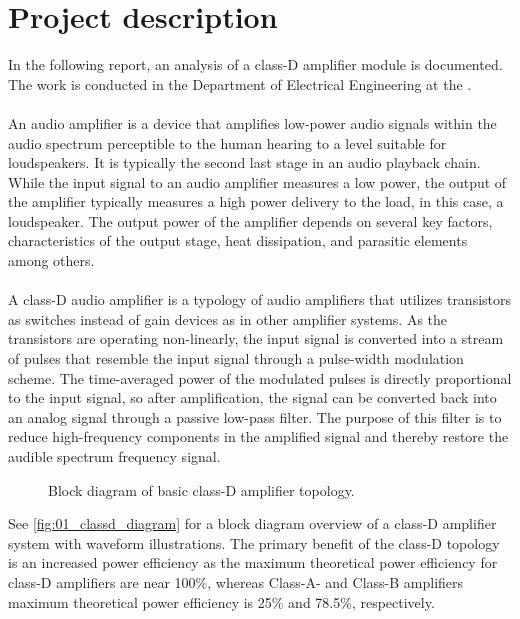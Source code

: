 \section{Project description} \label{sec:1.2_project_description}
In the following report, an analysis of a class-D amplifier module is documented. The work is conducted in the Department of Electrical Engineering at the \organisation. \\\\
An audio amplifier is a device that amplifies low-power audio signals within the audio spectrum perceptible to the human hearing to a level suitable for loudspeakers. It is typically the second last stage in an audio playback chain. While the input signal to an audio amplifier measures a low power, the output of the amplifier typically measures a high power delivery to the load, in this case, a loudspeaker. The output power of the amplifier depends on several key factors, characteristics of the output stage, heat dissipation, and parasitic elements among others. \\\\
A class-D audio amplifier is a typology of audio amplifiers that utilizes transistors as switches instead of gain devices as in other amplifier systems. As the transistors are operating non-linearly, the input signal is converted into a stream of pulses that resemble the input signal through a pulse-width modulation scheme. The time-averaged power of the modulated pulses is directly proportional to the input signal, so after amplification, the signal can be converted back into an analog signal through a passive low-pass filter. The purpose of this filter is to reduce high-frequency components in the amplified signal and thereby restore the audible spectrum frequency signal. \\

\begin{figure}[htbp]
    \centering
    
    \caption{Block diagram of basic class-D amplifier topology.}
    \label{fig:01_classd_diagram}
\end{figure}

See \autoref{fig:01_classd_diagram} for a block diagram overview of a class-D amplifier system with waveform illustrations.
The primary benefit of the class-D topology is an increased power efficiency as the maximum theoretical power efficiency for class-D amplifiers are near 100\%, whereas Class-A- and Class-B amplifiers maximum theoretical power efficiency is 25\% and 78.5\%, respectively.\\

